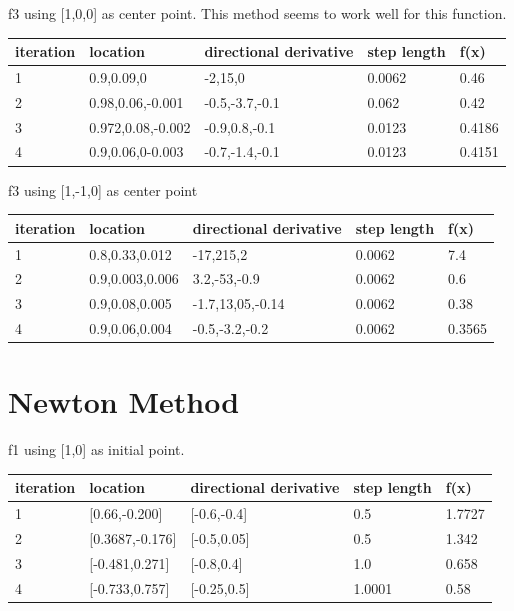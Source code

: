 \documentclass[7pt]{article}
\begin{document}
				
				f3 using [1,0,0] as center point. This method seems to work well for this function. 
				\begin{center}
					\begin{tabular}{ | l | l | l | l | l |}
						\hline
						iteration & location & directional derivative & step length & f(x) \\ \hline
						1& 0.9,0.09,0 & -2,15,0  & 0.0062 & 0.46\\ \hline
						2& 0.98,0.06,-0.001 & -0.5,-3.7,-0.1 & 0.062 & 0.42\\ \hline
						3& 0.972,0.08,-0.002 & -0.9,0.8,-0.1 & 0.0123 & 0.4186\\ \hline
						4& 0.9,0.06,0-0.003 & -0.7,-1.4,-0.1 & 0.0123 & 0.4151\\
						\hline
					\end{tabular}
				\end{center}
				
				
				f3 using [1,-1,0] as center point 
					\begin{center}		
						\begin{tabular}{ | l | l | l | l | l |}
							\hline
							iteration & location & directional derivative & step length & f(x) \\ \hline
							1& 0.8,0.33,0.012 & -17,215,2  & 0.0062 & 7.4\\ \hline
							2& 0.9,0.003,0.006 & 3.2,-53,-0.9  & 0.0062 & 0.6\\ \hline
							3& 0.9,0.08,0.005 & -1.7,13,05,-0.14 & 0.0062 & 0.38\\ \hline
							4& 0.9,0.06,0.004 & -0.5,-3.2,-0.2 & 0.0062 & 0.3565\\
							\hline
						\end{tabular}
					\end{center}
					
	\section{Newton Method}
	
	f1 using [1,0] as initial point. 
	\begin{center}
		\begin{tabular}{ | l | l | l | l | l |}
			\hline
			iteration & location & directional derivative & step length & f(x) \\ \hline
			1& [0.66,-0.200] & [-0.6,-0.4] & 0.5 & 1.7727\\ \hline
			2& [0.3687,-0.176] & [-0.5,0.05] & 0.5 & 1.342 \\ \hline
			3& [-0.481,0.271] & [-0.8,0.4] & 1.0 & 0.658\\ \hline
			4& [-0.733,0.757]  & [-0.25,0.5] & 1.0001 & 0.58\\
			\hline
		\end{tabular}
	\end{center}
	
\end{document}
